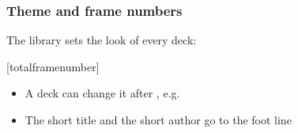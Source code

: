 \documentclass[aspectratio=169,10pt,compress]{beamer}
\begin{document}
\begin{frame}[t,fragile] \frametitle{Theme and frame numbers}
	\small The library sets the look of every deck:

\begin{texcode}
[totalframenumber]   %
\end{texcode}

	\begin{itemize}\small
		\item A deck can change it after , e.g.\
		\item The short title  and the short author
		\hCode{\textbackslash author[Bingol]\{\dots\}} go to the foot line
	\end{itemize}
\end{frame}




\end{document}
